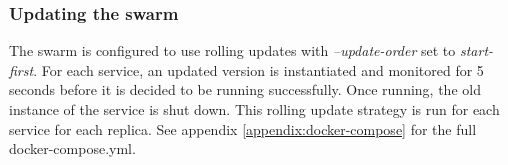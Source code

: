 \subsubsection{Updating the swarm}
The swarm is configured to use rolling updates with \textit{--update-order} set to \textit{start-first}. For each service, an updated version is instantiated and monitored for 5 seconds before it is decided to be running successfully. Once running, the old instance of the service is shut down. This rolling update strategy is run for each service for each replica. See appendix \ref{appendix:docker-compose} for the full docker-compose.yml.